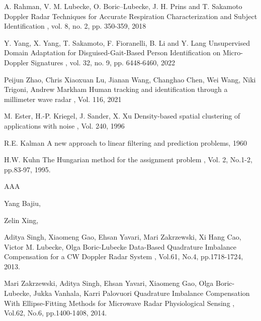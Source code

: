 \begin{bib}[100]
  A. Rahman, V. M. Lubecke, O. Boric–Lubecke, J. H. Prins and T. Sakamoto
  \newblock Doppler Radar Techniques for Accurate Respiration Characterization and Subject Identification
  , vol. 8, no. 2, pp. 350-359, 2018


  Y. Yang, X. Yang, T. Sakamoto, F. Fioranelli, B. Li and Y. Lang
  \newblock Unsupervised Domain Adaptation for Disguised-Gait-Based Person Identification on Micro-Doppler Signatures
  , vol. 32, no. 9, pp. 6448-6460, 2022

  Peijun Zhao, Chris Xiaoxuan Lu, Jianan Wang, Changhao Chen, Wei Wang, Niki Trigoni, Andrew Markham
  \newblock Human tracking and identification through a millimeter wave radar
  , Vol. 116, 2021

  M. Ester, H.-P. Kriegel, J. Sander, X. Xu
  \newblock Density-based spatial clustering of applications with noise
  , Vol. 240, 1996

  R.E. Kalman
  \newblock A new approach to linear filtering and prediction problems, 1960

  H.W. Kuhn
  \newblock The Hungarian method for the assignment problem
  , Vol. 2, No.1-2, pp.83-97, 1995.

  AAA

  Yang Bajiu, 

  Zelin Xing, 
	
  Aditya Singh, Xiaomeng Gao, Ehsan Yavari, Mari Zakrzewski, Xi Hang Cao, Victor M. Lubecke, Olga Boric-Lubecke
  \newblock Data-Based Quadrature Imbalance Compensation for a CW Doppler Radar System
  , Vol.61, No.4, pp.1718-1724, 2013.

  Mari Zakrzewski, Aditya Singh, Ehsan Yavari, Xiaomeng Gao, Olga Boric-Lubecke, Jukka Vanhala, Karri Palovuori
  \newblock Quadrature Imbalance Compensation With Ellipse-Fitting Methods for Microwave Radar Physiological Sensing
  , Vol.62, No.6, pp.1400-1408, 2014.


\end{bib}
